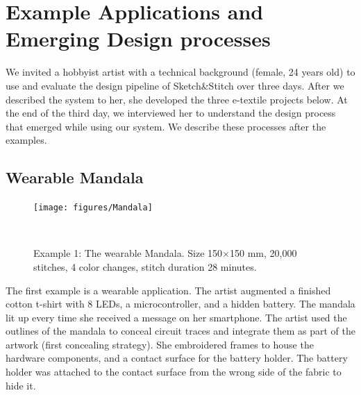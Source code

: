 \documentclass[header.tex]{subfiles}
\begin{document}
\section{Example Applications and Emerging Design processes}
We invited a hobbyist artist with a technical background (female, 24 years old) to use and evaluate the design pipeline of Sketch\&Stitch over three days. After we described the system to her, she developed the three e-textile projects below. At the end of the third day, we interviewed her to understand the design process that emerged while using our system. We describe these processes after the examples.


\subsection{Wearable Mandala}
\begin{figure} [h!]
\centering
  \texttt{[image: figures/Mandala]} 
  \caption{Example 1: The wearable Mandala. Size 150$\times$150 mm, 20,000 stitches, 4 color changes, stitch duration 28 minutes.}~\label{fig:Mandala}
  \vspace{-0.5em}
\end{figure}
The first example is a wearable application. The artist augmented a finished cotton t-shirt with 8 LEDs, a microcontroller, and a hidden battery. The mandala lit up every time she received a message on her smartphone. The artist used the outlines of the mandala to conceal circuit traces and integrate them as part of the artwork (first concealing strategy). She embroidered frames to house the hardware components, and a contact surface for the battery holder. The battery holder was attached to the contact surface from the wrong side of the fabric to hide it.
\end{document}
